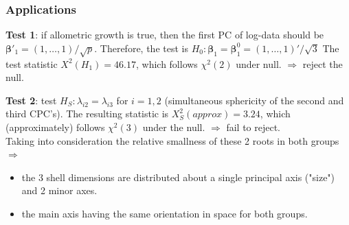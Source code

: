 \documentclass{beamer}
\begin{document}
\begin{frame}
	\frametitle{Applications}
	\textbf{Test 1}: if allometric growth is true, then the first PC of log-data should be $\bm{\beta}'_1 = (1,\ldots,1)/\sqrt{p}$. Therefore, the test is $H_0: \bm{\beta}_1 = \bm{\beta}^0_1 = (1,\ldots,1)'/\sqrt{3}$
	The test statistic $X^2(H_1) = 46.17$, which follows $\chi^2(2)$ under null. $\Rightarrow$  reject the null.
	
	\textbf{Test 2}: test $H_S:\lambda_{i2} = \lambda_{i3}$ for $i=1,2$ (simultaneous sphericity of the second and third CPC's).
	The resulting statistic is $X_S^2(approx) = 3.24$, which (approximately) follows $\chi^2(3)$ under the null. $\Rightarrow$ fail to reject.\\
	
	Taking into consideration the relative smallness of these 2 roots in both groups
	$\Rightarrow$
	\begin{itemize}
		\item 
		the 3 shell dimensions are distributed about a single principal axis ("size") and 2 minor axes.
		\item
		the main axis having the same orientation in space for both groups.
	\end{itemize}
	
	 
	 
	
	
	
	
	
	
	
	
	
\end{frame}
	
	
\end{document}
